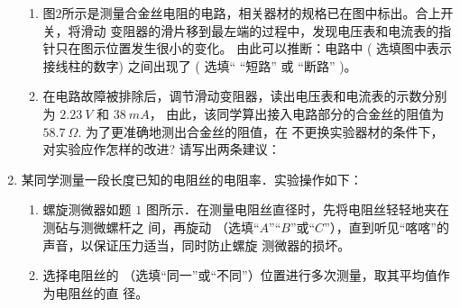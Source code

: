 \begin{enumerate}
\begin{enumerate}
\item 
图$ 2 $所示是测量合金丝电阻的电路，相关器材的规格已在图中标出。合上开关，将滑动
变阻器的滑片移到最左端的过程中，发现电压表和电流表的指针只在图示位置发生很小的变化。
由此可以推断：电路中 \underlinegap 
( 选填图中表示接线柱的数字) 之间出现了 \underlinegap 
( 选填“ “短路” 或 “断路” )。

\item 
在电路故障被排除后，调节滑动变阻器，读出电压表和电流表的示数分别为 $ 2.23 \ V $ 和 $ 38 \ mA $，
由此，该同学算出接入电路部分的合金丝的阻值为 $ 58.7 \ \Omega $. 为了更准确地测出合金丝的阻值，在
不更换实验器材的条件下，对实验应作怎样的改进? 请写出两条建议：

\hfullline 



\end{enumerate}



\item 
{}
某同学测量一段长度已知的电阻丝的电阻率．实验操作如下：
\begin{enumerate}
\item
螺旋测微器如题 $ 1 $ 图所示．在测量电阻丝直径时，先将电阻丝轻轻地夹在测砧与测微螺杆之
间，再旋动 \underlinegap （选填“$ A $”“$ B $”或“$ C $”），直到听见“喀喀”的声音，以保证压力适当，同时防止螺旋
测微器的损坏。
\begin{figure}[h!]
\centering

\end{figure}

\item 
选择电阻丝的 \underlinegap （选填“同一”或“不同”）位置进行多次测量，取其平均值作为电阻丝的直
径。


\end{enumerate}
\end{enumerate}
